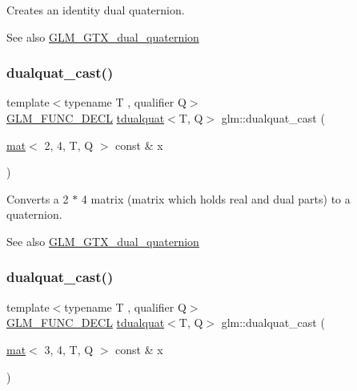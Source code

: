 Creates an identity dual quaternion.

\begin{DoxySeeAlso}{See also}
\mbox{\hyperlink{group__gtx__dual__quaternion}{G\+L\+M\+\_\+\+G\+T\+X\+\_\+dual\+\_\+quaternion}} 
\end{DoxySeeAlso}
\mbox{\label{group__gtx__dual__quaternion_gac4064ff813759740201765350eac4236}} 
\subsubsection{\texorpdfstring{dualquat\+\_\+cast()}{dualquat\_cast()}\hspace{0.1cm}{\footnotesize\ttfamily [1/2]}}
{\footnotesize\ttfamily template$<$typename T , qualifier Q$>$ \\
\mbox{\hyperlink{setup_8hpp_ab2d052de21a70539923e9bcbf6e83a51}{G\+L\+M\+\_\+\+F\+U\+N\+C\+\_\+\+D\+E\+CL}} \mbox{\hyperlink{structglm_1_1tdualquat}{tdualquat}}$<$T, Q$>$ glm\+::dualquat\+\_\+cast (\begin{DoxyParamCaption}\item[{\mbox{\hyperlink{structglm_1_1mat}{mat}}$<$ 2, 4, T, Q $>$ const \&}]{x }\end{DoxyParamCaption})}

Converts a 2 $\ast$ 4 matrix (matrix which holds real and dual parts) to a quaternion.

\begin{DoxySeeAlso}{See also}
\mbox{\hyperlink{group__gtx__dual__quaternion}{G\+L\+M\+\_\+\+G\+T\+X\+\_\+dual\+\_\+quaternion}} 
\end{DoxySeeAlso}
\mbox{\label{group__gtx__dual__quaternion_ga91025ebdca0f4ea54da08497b00e8c84}} 
\subsubsection{\texorpdfstring{dualquat\+\_\+cast()}{dualquat\_cast()}\hspace{0.1cm}{\footnotesize\ttfamily [2/2]}}
{\footnotesize\ttfamily template$<$typename T , qualifier Q$>$ \\
\mbox{\hyperlink{setup_8hpp_ab2d052de21a70539923e9bcbf6e83a51}{G\+L\+M\+\_\+\+F\+U\+N\+C\+\_\+\+D\+E\+CL}} \mbox{\hyperlink{structglm_1_1tdualquat}{tdualquat}}$<$T, Q$>$ glm\+::dualquat\+\_\+cast (\begin{DoxyParamCaption}\item[{\mbox{\hyperlink{structglm_1_1mat}{mat}}$<$ 3, 4, T, Q $>$ const \&}]{x }\end{DoxyParamCaption})}

